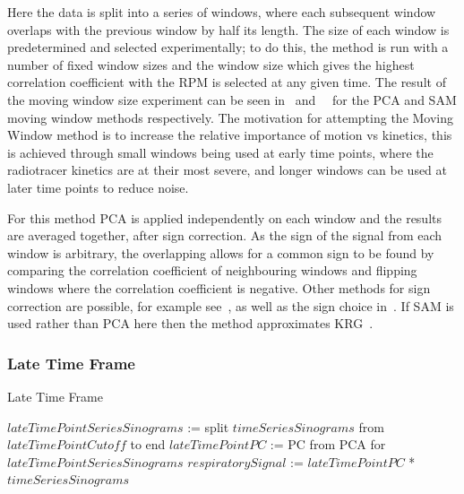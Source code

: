             Here the data is split into a series of windows, where each subsequent window overlaps with the previous window by half its length. The size of each window is predetermined and selected experimentally; to do this, the method is run with a number of fixed window sizes and the window size which gives the highest correlation coefficient with the \gls{RPM} is selected at any given time. The result of the moving window size experiment can be seen in~ and~~ for the \gls{PCA} and \gls{SAM} moving window methods respectively. The motivation for attempting the Moving Window method is to increase the relative importance of motion vs kinetics, this is achieved through small windows being used at early time points, where the radiotracer kinetics are at their most severe, and longer windows can be used at later time points to reduce noise.
            
            For this method \gls{PCA} is applied independently on each window and the results are averaged together, after sign correction. As the sign of the signal from each window is arbitrary,  the overlapping allows for a common sign to be found by comparing the correlation coefficient of neighbouring windows and flipping windows where the correlation coefficient is negative. Other methods for sign correction are possible, for example see~\cite{Bertolli2017, Feng2018Self-gating:PET}, as well as the sign choice in~. If \gls{SAM} is used rather than \gls{PCA} here then the method approximates \gls{KRG}~\cite{Schleyer2014}.
        
            
        \subsubsection{Late Time Frame} \label{sec:late_time_frame}
            \begin{algorithm}
                \caption{Late Time Frame}
                \;
                $lateTimePointSeriesSinograms$ := split $timeSeriesSinograms$ from $lateTimePointCutoff$ to end
                $lateTimePointPC$ := \gls{PC} from \gls{PCA} for $lateTimePointSeriesSinograms$
                $respiratorySignal$ := $lateTimePointPC$ * $timeSeriesSinograms$
            \end{algorithm} \label{eq:late_time_point_pseudo_code}
            
